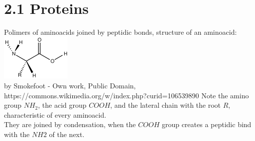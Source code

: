 \documentclass[a4paper,landscape,10pt]{cheatsheet}
\begin{document}
\hfill\\
\section*{2.1 Proteins}
Polimers of aminoacids joined by peptidic bonds, structure of an aminoacid:
\includegraphics{images/amino_acid_structure}\\
{\footnotesize by Smokefoot - Own work, Public Domain, https://commons.wikimedia.org/w/index.php?curid=106539890}
Note the amino group $NH_2$, the acid group $COOH$, and the lateral chain with the root $R$, characteristic of every aminoacid.\\
They are joined by condensation, when the $COOH$ group creates a peptidic bind with the $NH2$ of the next.

\hfill\\
\end{document}

